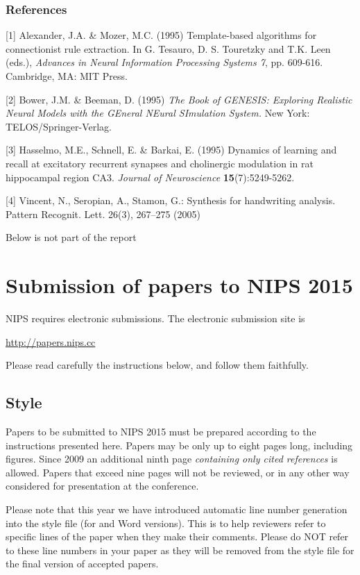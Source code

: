 \documentclass{article} %
\begin{document}
\subsubsection*{References}

\small{
[1] Alexander, J.A. \& Mozer, M.C. (1995) Template-based algorithms
for connectionist rule extraction. In G. Tesauro, D. S. Touretzky
and T.K. Leen (eds.), {\it Advances in Neural Information Processing
Systems 7}, pp. 609-616. Cambridge, MA: MIT Press.

[2] Bower, J.M. \& Beeman, D. (1995) {\it The Book of GENESIS: Exploring
Realistic Neural Models with the GEneral NEural SImulation System.}
New York: TELOS/Springer-Verlag.

[3] Hasselmo, M.E., Schnell, E. \& Barkai, E. (1995) Dynamics of learning
and recall at excitatory recurrent synapses and cholinergic modulation
in rat hippocampal region CA3. {\it Journal of Neuroscience}
{\bf 15}(7):5249-5262.
}

[4] Vincent, N., Seropian, A., Stamon, G.: Synthesis for handwriting
analysis. Pattern Recognit. Lett. 26(3), 267–275 (2005)



Below is not part of the report

\section{Submission of papers to NIPS 2015}

NIPS requires electronic submissions.  The electronic submission site is  
\begin{center}
   \url{http://papers.nips.cc}
\end{center}

Please read carefully the
instructions below, and follow them faithfully.
\subsection{Style}

Papers to be submitted to NIPS 2015 must be prepared according to the
instructions presented here. Papers may be only up to eight pages long,
including figures. Since 2009 an additional ninth page \textit{containing only
cited references} is allowed. Papers that exceed nine pages will not be
reviewed, or in any other way considered for presentation at the conference.

Please note that this year we have introduced automatic line number generation
into the style file (for \LaTeXe and Word versions). This is to help reviewers
refer to specific lines of the paper when they make their comments. Please do
NOT refer to these line numbers in your paper as they will be removed from the
style file for the final version of accepted papers.
\end{document}
